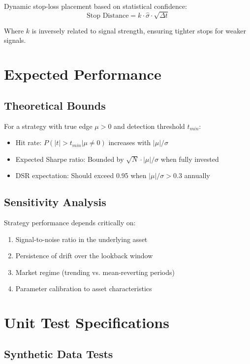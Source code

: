\documentclass{article}
\begin{document}
Dynamic stop-loss placement based on statistical confidence:
\begin{equation}
\text{Stop Distance} = k \cdot \hat{\sigma} \cdot \sqrt{\Delta t}
\end{equation}

Where $k$ is inversely related to signal strength, ensuring tighter stops for weaker signals.

\section{Expected Performance}

\subsection{Theoretical Bounds}

For a strategy with true edge $\mu > 0$ and detection threshold $t_{min}$:

\begin{itemize}
\item Hit rate: $P(|t| > t_{min} | \mu \neq 0)$ increases with $|\mu|/\sigma$
\item Expected Sharpe ratio: Bounded by $\sqrt{N} \cdot |\mu|/\sigma$ when fully invested
\item DSR expectation: Should exceed 0.95 when $|\mu|/\sigma > 0.3$ annually
\end{itemize}

\subsection{Sensitivity Analysis}

Strategy performance depends critically on:
\begin{enumerate}
\item Signal-to-noise ratio in the underlying asset
\item Persistence of drift over the lookback window
\item Market regime (trending vs. mean-reverting periods)
\item Parameter calibration to asset characteristics
\end{enumerate}

\section{Unit Test Specifications}

\subsection{Synthetic Data Tests}
\end{document}
